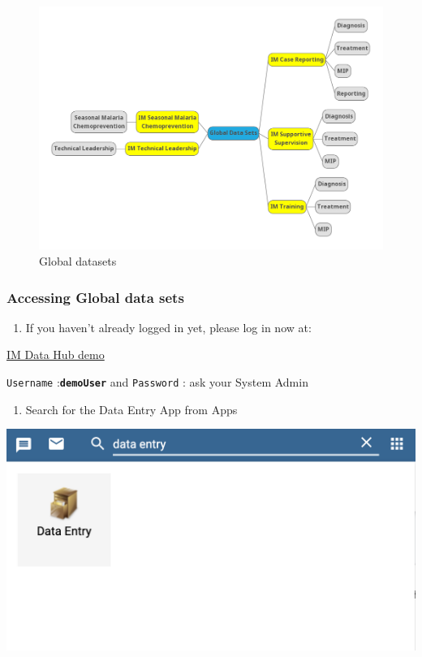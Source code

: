 \documentclass[]{book}
\providecommand{\tightlist}{%
  \setlength{\itemsep}{0pt}\setlength{\parskip}{0pt}}
\begin{document}
\begin{figure}
\includegraphics[width=13.47in]{./images/im datasets} \caption{Global datasets}\label{fig:im-datasets}
\end{figure}

\hypertarget{access-global-datasets}{%
\subsubsection{Accessing Global data sets}\label{access-global-datasets}}

\begin{enumerate}
\def\labelenumi{\arabic{enumi}.}
\tightlist
\item
  If you haven't already logged in yet, please log in now at:
\end{enumerate}

\href{https://imdatahub.org}{IM Data Hub demo}

\texttt{Username} :\textbf{\texttt{demoUser}} and \texttt{Password} : ask your System Admin

\begin{enumerate}
\def\labelenumi{\arabic{enumi}.}
\setcounter{enumi}{1}
\tightlist
\item
  Search for the Data Entry App from Apps
\end{enumerate}

\includegraphics[width=15.28in]{./images/data-entry-app2}
\end{document}
